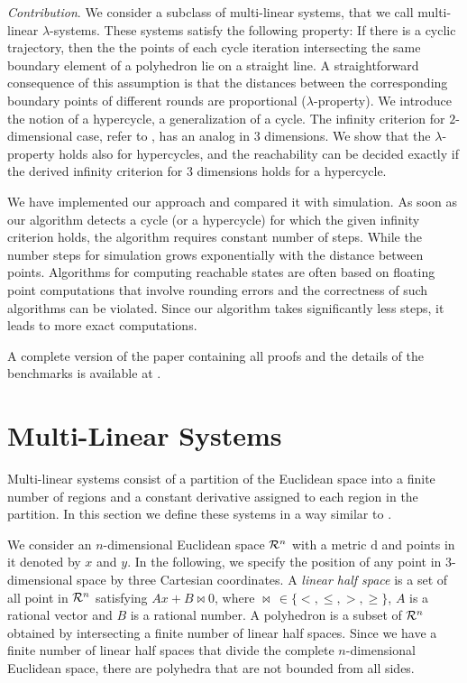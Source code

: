 \documentclass[copyright,creativecommons]{packages/eptcs}
\newcommand{\m}{{\mbox{d}}}
\begin{document}
{\it Contribution}. 
We  consider  a subclass of multi-linear systems,  that we call multi-linear $\lambda$-systems. These systems 
 satisfy the following property: If there is a cyclic trajectory, then  the the points of each cycle iteration intersecting the same boundary element of a polyhedron lie on a straight line. A straightforward consequence of this assumption is that the distances between the corresponding boundary points of different rounds are proportional ($\lambda$-property). 
We  introduce the notion of a hypercycle, a generalization of a cycle. The infinity criterion for $2$-dimensional case, refer to \cite{MP93}, has an analog in $3$ dimensions. We show  that the $\lambda$-property holds also for hypercycles, and the reachability can be decided exactly if the derived infinity criterion for $3$ dimensions holds for a hypercycle. 

We have implemented our approach and compared it with simulation.
As soon as our algorithm detects a cycle (or a hypercycle) for which the given infinity criterion holds, the algorithm requires constant number of steps. While the number steps for simulation grows exponentially with the distance between points. 
Algorithms for  computing  reachable states  are often based on floating point computations  that involve rounding errors and the correctness of such algorithms can be violated. Since our algorithm takes significantly less steps, it leads to more exact computations.  
 

A complete version of the paper containing all proofs and the details of the benchmarks is available at 
\cite{TF11-2}.

\section{Multi-Linear  Systems}\label{sec:basics}

Multi-linear systems consist of a partition of the  Euclidean space into a finite number of regions  and a constant derivative
assigned to each region in the partition. 
In this section we define these systems in a way similar to \cite{MP93}.


We consider an $n$-dimensional Euclidean space  ${\cal{R}}^{n}$ with a metric $\m$ and points in it denoted by $x$ and $y$. In the following, we  specify the position of any point in $3$-dimensional space by three Cartesian coordinates. 
A {\em linear half space} is a set of all point in ${\cal{R}}^{n}$ satisfying $Ax+B \bowtie 0$, where $\bowtie\,\in \{<,\leq,>,\geq\}$, $A$ is a rational vector and $B$ is a rational number.
A polyhedron is a  subset  of ${\cal{R}}^{n}$ obtained by  intersecting a finite number of linear half spaces. 
Since we have  a finite number of linear half spaces that divide the complete $n$-dimensional Euclidean space, there are polyhedra that are not bounded from all sides. 
\end{document}
